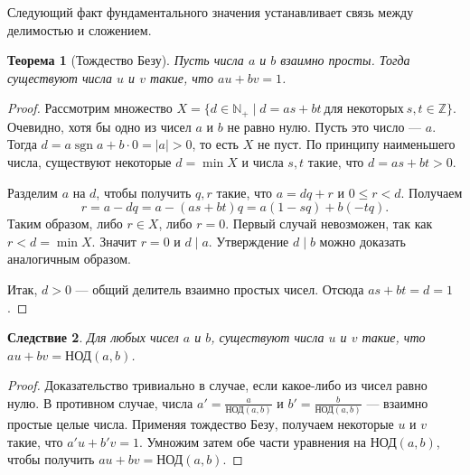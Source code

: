 \documentclass[12pt,notitlepage]{article}
\theoremstyle{plain}
\newtheorem{thm}{Теорема}[section]
\newtheorem{corr}[thm]{Следствие}
\theoremstyle{definition}
\theoremstyle{plain}
\newcommand{\N}{\mathbb{N}}
\newcommand{\Z}{\mathbb{Z}}
\newcommand{\1}{\mathbf{1}}
\newcommand{\0}{\mathbf{0}}
\newcommand{\dvd}{\mathop{\mid}}
\DeclareMathOperator{\sgn}{sgn}
\begin{document}
\noindent Следующий факт фундаментального значения устанавливает связь между делимостью и сложением.
\begin{thm}[Тождество Безу]\label{L5:t1}
	Пусть числа $a$ и $b$ взаимно просты. Тогда существуют числа $u$ и $v$ такие, что $a u + b v = 1$.
\end{thm}
\begin{proof}
	Рассмотрим множество $X = \{ d \in \N_+  \mid  d = a s + b t\ \text{для некоторых}\ s, t \in \Z \}$. Очевидно, хотя бы одно из чисел $a$ и $b$ не равно нулю. Пусть это число --- $a$. Тогда $d = a \sgn a + b \cdot 0 = |a| > 0$, то есть $X$ не пуст. По принципу наименьшего числа, существуют некоторые $d = \min X$ и числа $s,t$ такие, что $d = a s + b t > 0$.
	
	Разделим $a$ на $d$, чтобы получить $q, r$ такие, что $a = d q + r$ и $0 \leq r < d$. Получаем
	$$r = a - d q = a - (a s + b t) q = a (1 - sq) + b(-tq).$$
	Таким образом, либо $r \in X$, либо $r = 0$. Первый случай невозможен, так как $r < d = \min X$. Значит $r = 0$ и $d \dvd a$. Утверждение $d \dvd b$ можно доказать аналогичным образом.
	
	Итак, $d > 0$ --- общий делитель взаимно простых чисел. Отсюда $a s + b t = d = 1$.
\end{proof}

\begin{corr}\label{L5:bezout_int}
	Для любых чисел $a$ и $b$, существуют числа $u$ и $v$ такие, что $a u + b v = \text{НОД}(a,b)$.
\end{corr}
\begin{proof}
	Доказательство тривиально в случае, если какое-либо из чисел равно нулю. В противном случае, числа $a' = \frac{a}{\text{НОД}(a, b)}$ и $b' = \frac{b}{\text{НОД}(a, b)}$ --- взаимно простые целые числа. Применяя тождество Безу, получаем некоторые $u$ и $v$ такие, что $a'u + b'v = 1$. Умножим затем обе части уравнения на $\text{НОД}(a,b)$, чтобы получить $a u + b v = \text{НОД}(a, b)$.
\end{proof}
\end{document}
